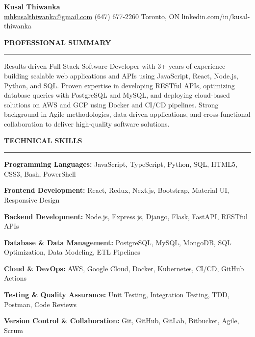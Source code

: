 \documentclass[10pt,letterpaper]{article}
\begin{document}
\begin{center}
{\LARGE\textbf{Kusal Thiwanka}}\\[3pt]
\href{mailto:mhkusalthiwanka@gmail.com}{mhkusalthiwanka@gmail.com}\hspace{2em}%
(647) 677{-}2260\hspace{2em}%
Toronto, ON\hspace{2em}
linkedin.com/in/kusal-thiwanka
\end{center}

\vspace{6pt}

\textbf{PROFESSIONAL SUMMARY}\\[-8pt]
\noindent\rule{\textwidth}{1pt}

\vspace{-2pt}

Results-driven Full Stack Software Developer with 3+ years of experience building scalable web applications and APIs using JavaScript, React, Node.js, Python, and SQL. Proven expertise in developing RESTful APIs, optimizing database queries with PostgreSQL and MySQL, and deploying cloud-based solutions on AWS and GCP using Docker and CI/CD pipelines. Strong background in Agile methodologies, data-driven applications, and cross-functional collaboration to deliver high-quality software solutions.

\vspace{8pt}

\textbf{TECHNICAL SKILLS}\\[-8pt]
\noindent\rule{\textwidth}{1pt}

\vspace{-2pt}

\textbf{Programming Languages:} JavaScript, TypeScript, Python, SQL, HTML5, CSS3, Bash, PowerShell

\textbf{Frontend Development:} React, Redux, Next.js, Bootstrap, Material UI, Responsive Design

\textbf{Backend Development:} Node.js, Express.js, Django, Flask, FastAPI, RESTful APIs

\textbf{Database \& Data Management:} PostgreSQL, MySQL, MongoDB, SQL Optimization, Data Modeling, ETL Pipelines

\textbf{Cloud \& DevOps:} AWS, Google Cloud, Docker, Kubernetes, CI/CD, GitHub Actions

\textbf{Testing \& Quality Assurance:} Unit Testing, Integration Testing, TDD, Postman, Code Reviews

\textbf{Version Control \& Collaboration:} Git, GitHub, GitLab, Bitbucket, Agile, Scrum
\end{document}
